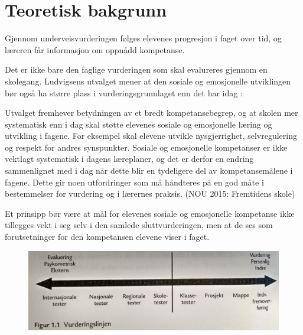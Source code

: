 \documentclass[main.tex]{subfiles}
\begin{document}
\section*{Teoretisk bakgrunn}
Gjennom underveisvurderingen følges elevenes progresjon
i faget over tid, og læreren får informasjon
om oppnådd kompetanse.

Det er ikke bare den faglige vurderingen som skal evalureres gjennom en skolegang. Ludvigsens utvalget mener
at den sosiale og emosjonelle utviklingen bør også ha større plass i vurderingsgrunnlaget enn det har idag :
\begin{displayquote}
Utvalget fremhever betydningen av et bredt kompetansebegrep,
og at skolen mer systematisk enn
i dag skal støtte elevenes sosiale og emosjonelle
læring og utvikling i fagene. For eksempel skal
elevene utvikle nysgjerrighet, selvregulering og
respekt for andres synspunkter. Sosiale og emosjonelle
kompetanser er ikke vektlagt systematisk
i dagens læreplaner, og det er derfor en endring
sammenlignet med i dag når dette blir en tydeligere
del av kompetansemålene i fagene. Dette
gir noen utfordringer som må håndteres på en
god måte i bestemmelser for vurdering og i lærernes
praksis. (NOU 2015: Fremtidens skole)
\end{displayquote}

Et prinsipp bør være at mål for elevenes sosiale
og emosjonelle kompetanse ikke tillegges vekt
i seg selv i den samlede sluttvurderingen, men at
de ses som forutsetninger for den kompetansen
elevene viser i faget.

\begin{figure}[h!]
\includegraphics[scale = 0.1]{../figures/vurderingslinjen.png}
\end{figure}
\end{document}
